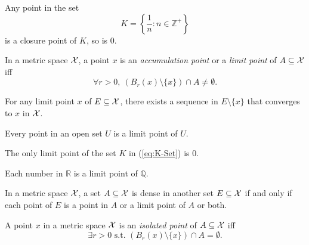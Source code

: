 \begin{exm}
  Any point in the set
   \begin{equation}
     \label{eq:K-Set}
     K=\left\{\frac{1}{n}: n\in \mathbb{Z}^+\right\}
   \end{equation}
   is a closure point of $K$,
   so is 0.
\end{exm}

\begin{defn}
  \label{def:limitPointMetricSpace}
  In a metric space ${\cal X}$, a point $x$ 
   is an \emph{accumulation point}
   or a \emph{limit point} of $A\subseteq {\cal X}$ iff
  \begin{equation}
    \label{eq:accumulationPointMetricSpace}
    \forall r>0,\ \left(B_r(x)\setminus\{x\}\right)\cap A
    \ne \emptyset. 
  \end{equation}
\end{defn}


\begin{lem}
  \label{lem:limitPointImpliesConvergence}
  For any limit point $x$ of $E\subseteq {\cal X}$,
  there exists a sequence in $E\setminus \{x\}$
  that converges to $x$ in ${\cal X}$.
\end{lem}

\begin{exm}
  Every point in an open set $U$ is a limit point of $U$. 
\end{exm}

\begin{exm}
  The only limit point of the set $K$ in (\ref{eq:K-Set}) is 0.
\end{exm}

\begin{exm}
  Each number in $\mathbb{R}$ 
   is a limit point of $\mathbb{Q}$.
\end{exm}

\begin{lem}
  \label{lem:denseSet}
  In a metric space ${\cal X}$,
  a set $A\subseteq {\cal X}$ is dense
  in another set $E\subseteq{\cal X}$
  if and only if %
  each point of $E$ is a point in $A$
  or a limit point of $A$ or both.
\end{lem}

\begin{defn}
  A point $x$ in a metric space ${\cal X}$
   is an \emph{isolated point} of $A\subseteq {\cal X}$ iff
  \begin{equation}
    \label{eq:isolatedPointMetricSpace}
    \exists r>0 \text{ s.t. } \left(B_r(x)\setminus\{x\}\right)\cap A
    = \emptyset. 
  \end{equation}
\end{defn}


